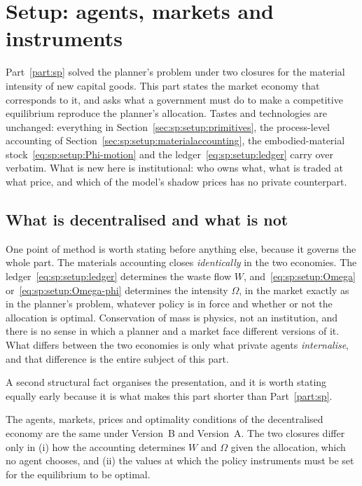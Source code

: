 ﻿\section{Setup: agents, markets and instruments}\label{sec:mkt:setup}

Part~\ref{part:sp} solved the planner's problem under two closures for the material intensity of new
capital goods. This part states the market economy that corresponds to it, and asks what a government
must do to make a competitive equilibrium reproduce the planner's allocation. Tastes and technologies
are unchanged: everything in Section~\ref{sec:sp:setup:primitives}, the process-level accounting of
Section~\ref{sec:sp:setup:materialaccounting}, the embodied-material
stock~\eqref{eq:sp:setup:Phi-motion} and the ledger~\eqref{eq:sp:setup:ledger} carry over verbatim.
What is new here is institutional: who owns what, what is traded at what price, and which of the
model's shadow prices has no private counterpart.


\subsection{What is decentralised and what is not}\label{sec:mkt:setup:what}

One point of method is worth stating before anything else, because it governs the whole part. The
materials accounting closes \emph{identically} in the two economies. The
ledger~\eqref{eq:sp:setup:ledger} determines the waste flow $W$, and~\eqref{eq:sp:setup:Omega}
or~\eqref{eq:sp:setup:Omega-phi} determines the intensity $\Omega$, in the market exactly as in the
planner's problem, whatever policy is in force and whether or not the allocation is optimal.
Conservation of mass is physics, not an institution, and there is no sense in which a planner and a
market face different versions of it. What differs between the two economies is only what private
agents \emph{internalise}, and that difference is the entire subject of this part.

A second structural fact organises the presentation, and it is worth stating equally early because it
is what makes this part shorter than Part~\ref{part:sp}.

\begin{proposition}\label{prop:mkt:common}
The agents, markets, prices and optimality conditions of the decentralised economy are the same under
Version~B and Version~A. The two closures differ only in (i) how the accounting
determines $W$ and $\Omega$ given the allocation, which no agent chooses, and (ii) the values at which
the policy instruments must be set for the equilibrium to be optimal.
\end{proposition}

